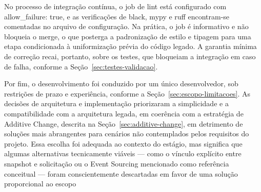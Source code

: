 No processo de integração contínua, o job de lint está configurado com 
allow\_failure: true, e as verificações de black, mypy e ruff encontram-se 
comentadas no arquivo de configuração. Na prática, o job 
é informativo e não bloqueia o merge, o que posterga a padronização de 
estilo e tipagem para uma etapa condicionada à uniformização prévia do código legado. 
A garantia mínima de correção recai, portanto, sobre os testes, que bloqueiam a 
integração em caso de falha, conforme a Seção~\ref{sec:testes-validacao}.

Por fim, o desenvolvimento foi conduzido por um único desenvolvedor, sob 
restrições de prazo e experiência, conforme a Seção~\ref{sec:escopo-limitacoes}. As decisões de arquitetura e 
implementação priorizaram a simplicidade e a compatibilidade com a arquitetura 
legada, em coerência com a estratégia de Additive Change, descrita na Seção~\ref{sec:additive-change}, em 
detrimento de soluções mais abrangentes para cenários não contemplados pelos 
requisitos do projeto. Essa escolha foi adequada ao contexto do estágio, mas 
significa que algumas alternativas tecnicamente viáveis — como o vínculo 
explícito entre snapshot e solicitação ou o Event Sourcing mencionado como 
referência conceitual — foram conscientemente descartadas em 
favor de uma solução proporcional ao escopo